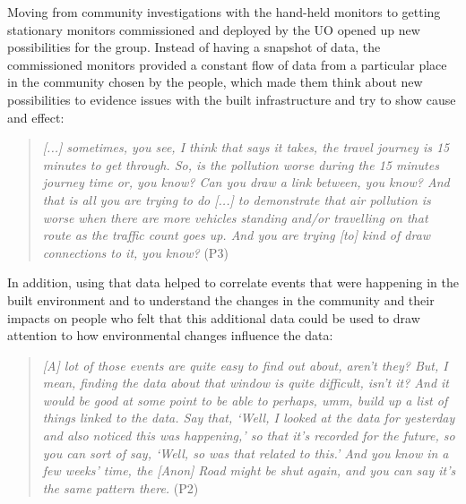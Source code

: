 Moving from community investigations with the hand-held monitors to getting stationary monitors commissioned and deployed by the UO opened up new possibilities for the group. Instead of having a snapshot of data, the commissioned monitors provided a constant flow of data from a particular place in the community chosen by the people, which made them think about new possibilities to evidence issues with the built infrastructure and try to show cause and effect:
\begin{quote}
    \textit{[...] sometimes, you see, I think that says it takes, the travel journey is 15 minutes to get through. So, is the pollution worse during the 15 minutes journey time or, you know? Can you draw a link between, you know? And that is all you are trying to do [...] to demonstrate that air pollution is worse when there are more vehicles standing and/or travelling on that route as the traffic count goes up. And you are trying [to] kind of draw connections to it, you know?} (P3)
\end{quote}
In addition, using that data helped to correlate events that were happening in the built environment and to understand the changes in the community and their impacts on people who felt that this additional data could be used to draw attention to how environmental changes influence the data: 
\begin{quote}
    \textit{[A] lot of those events are quite easy to find out about, aren't they? But, I mean, finding the data about that window is quite difficult, isn't it? And it would be good at some point to be able to perhaps, umm, build up a list of things linked to the data. Say that, `Well, I looked at the data for yesterday and also noticed this was happening,' so that it's recorded for the future, so you can sort of say, `Well, so was that related to this.' And you know in a few weeks' time, the [Anon] Road might be shut again, and you can say it's the same pattern there.} (P2)
\end{quote}

